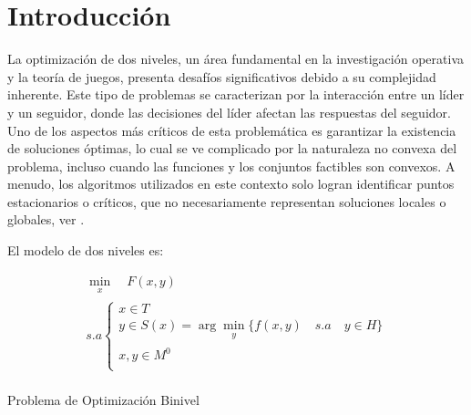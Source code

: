 \chapter{Introducción}
La optimización de dos niveles, un área fundamental en la investigación operativa y la teoría de juegos, presenta desafíos significativos debido a su complejidad inherente. Este tipo de problemas se caracterizan por la interacción entre un líder y un seguidor, donde las decisiones del líder afectan las respuestas del seguidor. Uno de los aspectos más críticos de esta problemática es garantizar la existencia de soluciones óptimas, lo cual se ve complicado por la naturaleza no convexa del problema, incluso cuando las funciones y los conjuntos factibles son convexos. A menudo, los algoritmos utilizados en este contexto solo logran identificar puntos estacionarios o críticos, que no necesariamente representan soluciones locales o globales, ver \cite{DempeyZemkoho2020}.


El modelo de dos niveles es:

\begin{table}[H]

    \[\begin{array}{l}
        \underset{\substack{x}}{\min} \quad F(x, y)\\
        s.a \left\{ \begin{array}{l}
            x \in T \\
             y \in S(x) = \arg  \underset{\substack{y}}{\min} \{ f(x, y) \quad s.a \quad y \in  H \}\\
            x,y \in M^0 \\
        \end{array}\right.
        \tag{\theequation}
        \label{eq:Def1Binivel}
    \end{array}\]\\


    \caption*{Problema de Optimización Binivel}
    \end{table}

